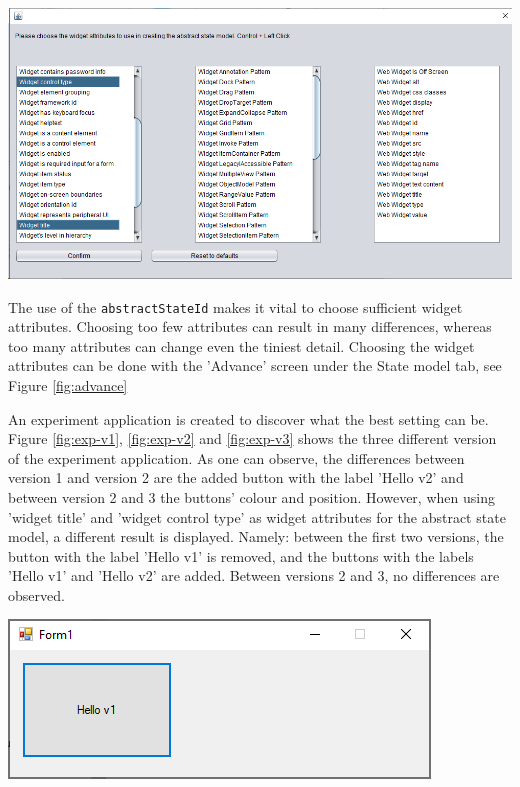 \begingroup
\captionsetup{type=figure}
\includegraphics[scale=0.5]{pics/attributes-state-model.png}
\label{fig:advance}
\endgroup

The use of the \verb|abstractStateId| makes it vital to choose sufficient widget attributes. Choosing too few attributes can result in many differences, whereas too many attributes can change even the tiniest detail. Choosing the widget attributes can be done with the 'Advance' screen under the State model tab, see Figure \ref{fig:advance}

An experiment application is created to discover what the best setting can be. Figure \ref{fig:exp-v1}, \ref{fig:exp-v2} and \ref{fig:exp-v3} shows the three different version of the experiment application. As one can observe, the differences between version 1 and version 2 are the added button with the label 'Hello v2' and between version 2 and 3 the buttons' colour and position. However, when using 'widget title' and 'widget control type' as widget attributes for the abstract state model, a different result is displayed. Namely: between the first two versions, the button with the label 'Hello v1' is removed, and the buttons with the labels 'Hello v1' and 'Hello v2' are added. Between versions 2 and 3, no differences are observed. 

\begingroup
\captionsetup{type=figure}
\includegraphics[scale=1]{pics/exp-v1.png}
\label{fig:exp-v1}
\endgroup

